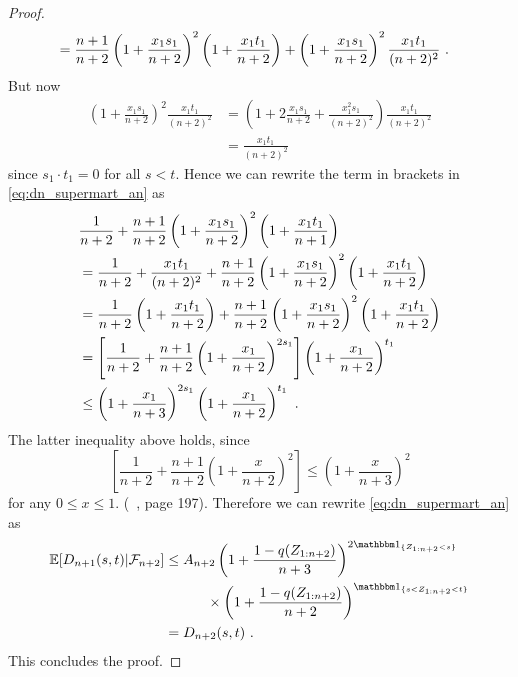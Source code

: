 \begin{lemma}
\begin{proof}
\begin{align*}
			&= \frac{n+1}{n+2}\left(1+\frac{x_1s_1}{n+2}\right)^{2}\left(1+\frac{x_1t_1}{n+2}\right) + \left(1+\frac{x_1s_1}{n+2}\right)^{2}\frac{x_1t_1}{(n+2)^2}\textrm{ .} 
		\end{align*}
		But now 
		\begin{align*}
			\left(1+\frac{x_1s_1}{n+2}\right)^{2}\frac{x_1t_1}{(n+2)^2} &= \left(1+2\frac{x_1s_1}{n+2}+\frac{x^2_1s_1}{(n+2)^2}\right)\frac{x_1t_1}{(n+2)^2}\\
			&= \frac{x_1t_1}{(n+2)^2}
		\end{align*}
		since $s_1\cdot t_1=0$ for all $s<t$. Hence we can rewrite the term in brackets in \eqref{eq:dn_supermart_an} as 
		\begin{align*}
			&\frac{1}{n+2} + \frac{n+1}{n+2}\left(1+\frac{x_1s_1}{n+2}\right)^{2} \left(1+\frac{x_1t_1}{n+1}\right) \\
			&=\frac{1}{n+2} + \frac{x_1t_1}{(n+2)^2} + \frac{n+1}{n+2}\left(1+\frac{x_1s_1}{n+2}\right)^{2}\left(1+\frac{x_1t_1}{n+2}\right)\\
			&=\frac{1}{n+2}\left(1+\frac{x_1t_1}{n+2}\right) + \frac{n+1}{n+2}\left(1+\frac{x_1s_1}{n+2}\right)^{2}\left(1+\frac{x_1t_1}{n+2}\right)\\
			&=\left[\frac{1}{n+2} + \frac{n+1}{n+2}\left(1+\frac{x_1}{n+2}\right)^{2s_1}\right]\left(1+\frac{x_1}{n+2}\right)^{t_1}\\
			&\leq \left(1+\frac{x_1}{n+3}\right)^{2s_1}\left(1+\frac{x_1}{n+2}\right)^{t_1}\textrm{ .} 
		\end{align*}
		The latter inequality above holds, since 
		$$\left[\frac{1}{n+2} + \frac{n+1}{n+2}\left(1+\frac{x}{n+2}\right)^{2}\right] \leq \left(1+\frac{x}{n+3}\right)^{2}$$
		for any $0\leq x\leq 1$. (\cf\ \cite{bose1999strong}, page 197). Therefore we can rewrite \eqref{eq:dn_supermart_an} as
		\begin{align*}
			\E[D_{n+1}(s,t)| \F_{n+2}]	&\leq A_{n+2} \left(1+\frac{1-q(Z_{1:n+2})}{n+3}\right)^{2\I{Z_{1:n+2}<s}} \\
			&\qquad\quad \times \left(1+\frac{1-q(Z_{1:n+2})}{n+2}\right)^{\I{s<Z_{1:n+2} <t}}\\
			&= D_{n+2}(s,t)\mdot
		\end{align*}		
		This concludes the proof.
	\end{proof}
\end{lemma}
%
